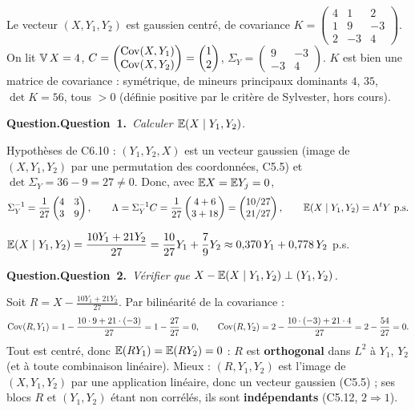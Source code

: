\documentclass[11pt,a4paper]{article}
\newcommand{\question}[2]{\par\medskip\noindent\textbf{\ifx\relax#1\relax Question.\else Question~#1.\fi}~\textit{#2}\par\smallskip}
\begin{document}
\begin{exo}
Le vecteur $(X,Y_1,Y_2)$ est gaussien centré, de covariance $K=\begin{pmatrix}4&1&2\\1&9&-3\\2&-3&4\end{pmatrix}$. On lit
$\operatorname{\mathbb{V}} X=4$, $C=\begin{pmatrix}\operatorname{Cov}(X,Y_1)\\\operatorname{Cov}(X,Y_2)\end{pmatrix}=\begin{pmatrix}1\\2\end{pmatrix}$,
$\Sigma_Y=\begin{pmatrix}9&-3\\-3&4\end{pmatrix}$.
$K$ est bien une matrice de covariance : symétrique, de mineurs principaux dominants $4$, $35$, $\det K=56$, tous $>0$ (définie positive par le critère de Sylvester, hors cours).

\question{1}{Calculer $\mathbb{E}(X\mid Y_1,Y_2)$.}

Hypothèses de C6.10 : $(Y_1,Y_2,X)$ est un vecteur gaussien (image de $(X,Y_1,Y_2)$ par une permutation des coordonnées, C5.5) et
$\det\Sigma_Y=36-9=27\ne0$. Donc, avec $\mathbb{E} X=\mathbb{E} Y_j=0$,
\[\Sigma_Y^{-1}=\frac1{27}\begin{pmatrix}4&3\\3&9\end{pmatrix},\qquad
\Lambda=\Sigma_Y^{-1}C=\frac1{27}\begin{pmatrix}4+6\\3+18\end{pmatrix}=\begin{pmatrix}10/27\\21/27\end{pmatrix},\qquad
\mathbb{E}(X\mid Y_1,Y_2)=\Lambda^tY\ \text{p.s.}\]

\begin{resultat}
$\displaystyle\mathbb{E}(X\mid Y_1,Y_2)=\frac{10Y_1+21Y_2}{27}=\frac{10}{27}Y_1+\frac79Y_2\approx0{,}370\,Y_1+0{,}778\,Y_2$ \quad p.s.
\end{resultat}

\question{2}{Vérifier que $X-\mathbb{E}(X\mid Y_1,Y_2)\perp(Y_1,Y_2)$.}

Soit $R=X-\frac{10Y_1+21Y_2}{27}$. Par bilinéarité de la covariance :
\[\operatorname{Cov}(R,Y_1)=1-\frac{10\cdot9+21\cdot(-3)}{27}=1-\frac{27}{27}=0,\qquad
\operatorname{Cov}(R,Y_2)=2-\frac{10\cdot(-3)+21\cdot4}{27}=2-\frac{54}{27}=0 .\]
Tout est centré, donc $\mathbb{E}(RY_1)=\mathbb{E}(RY_2)=0$ : $R$ est \textbf{orthogonal} dans $L^2$ à $Y_1$, $Y_2$ (et à toute combinaison linéaire). Mieux :
$(R,Y_1,Y_2)$ est l'image de $(X,Y_1,Y_2)$ par une application linéaire, donc un vecteur gaussien (C5.5) ; ses blocs $R$ et $(Y_1,Y_2)$
étant non corrélés, ils sont \textbf{indépendants} (C5.12, $2\Rightarrow1$).


\end{exo}
\end{document}
